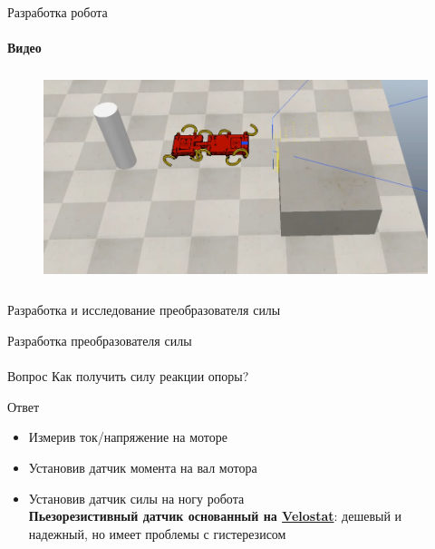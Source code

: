 \documentclass[aspectratio=169,xcolor=table]{beamer}
\begin{document}
\begin{frame}[t]{Разработка робота}
    \framesubtitle{Видео}
    \vspace{-0.6cm}
    \begin{figure}[H]
        \href{https://youtu.be/EQ6oGZVDpoc}{
            \centering\includegraphics[height=6cm,width=1\textwidth,keepaspectratio]{sidestep_segment_video_preview.png}}
    \end{figure}
\end{frame}


\begin{frame}[c]{}
    \framesubtitle{}
    \centering\LARGE Разработка и исследование преобразователя силы
\end{frame}

\begin{frame}[t]{Разработка преобразователя силы}
    \framesubtitle{}
    {\large\begin{block}{Вопрос}
            Как получить силу реакции опоры?
        \end{block}}
    {\large\begin{alertblock}{Ответ}
            \vspace{-0.2cm}

            \begin{itemize}
                \color{lightgray}
                \item Измерив ток/напряжение на моторе
                \item Установив датчик момента на вал мотора
                \item {\color{black} Установив датчик силы на ногу робота \\  \alert{\textbf{Пьезорезистивный датчик основанный на \underline{Velostat}}: дешевый и надежный, но имеет проблемы с гистерезисом}}
            \end{itemize}
        \end{alertblock}}
\end{frame}
\end{document}
